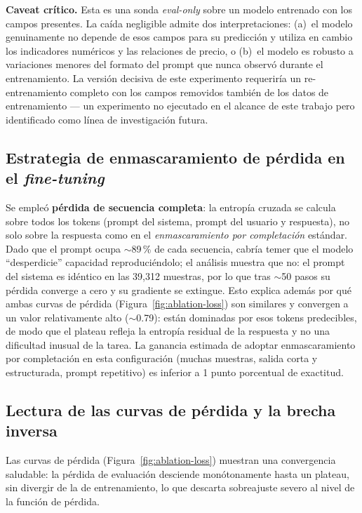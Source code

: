 \documentclass[10pt,twocolumn]{article}
\begin{document}
\textbf{Caveat cr\'itico.} Esta es una sonda \textit{eval-only} sobre un modelo entrenado con los campos presentes. La ca\'ida negligible admite dos interpretaciones: (a)~el modelo genuinamente no depende de esos campos para su predicci\'on y utiliza en cambio los indicadores num\'ericos y las relaciones de precio, o (b)~el modelo es robusto a variaciones menores del formato del prompt que nunca observ\'o durante el entrenamiento. La versi\'on decisiva de este experimento requerir\'ia un re-entrenamiento completo con los campos removidos tambi\'en de los datos de entrenamiento --- un experimento no ejecutado en el alcance de este trabajo pero identificado como l\'inea de investigaci\'on futura.

\subsection{Estrategia de enmascaramiento de p\'erdida en el \textit{fine-tuning}}
\label{sec:loss-masking}

Se emple\'o \textbf{p\'erdida de secuencia completa}: la entrop\'ia cruzada se calcula sobre todos los tokens (prompt del sistema, prompt del usuario y respuesta), no solo sobre la respuesta como en el \textit{enmascaramiento por completaci\'on} est\'andar. Dado que el prompt ocupa $\sim$89\,\% de cada secuencia, cabr\'ia temer que el modelo ``desperdicie'' capacidad reproduci\'endolo; el an\'alisis muestra que no: el prompt del sistema es id\'entico en las 39,312 muestras, por lo que tras $\sim$50 pasos su p\'erdida converge a cero y su gradiente se extingue. Esto explica adem\'as por qu\'e ambas curvas de p\'erdida (Figura~\ref{fig:ablation-loss}) son similares y convergen a un valor relativamente alto ($\sim$0.79): est\'an dominadas por esos tokens predecibles, de modo que el plateau refleja la entrop\'ia residual de la respuesta y no una dificultad inusual de la tarea. La ganancia estimada de adoptar enmascaramiento por completaci\'on en esta configuraci\'on (muchas muestras, salida corta y estructurada, prompt repetitivo) es inferior a 1 punto porcentual de exactitud.

\subsection{Lectura de las curvas de p\'erdida y la brecha inversa}
\label{sec:gap-interpretation}

Las curvas de p\'erdida (Figura~\ref{fig:ablation-loss}) muestran una convergencia saludable: la p\'erdida de evaluaci\'on desciende mon\'otonamente hasta un plateau, sin divergir de la de entrenamiento, lo que descarta sobreajuste severo al nivel de la funci\'on de p\'erdida.
\end{document}
